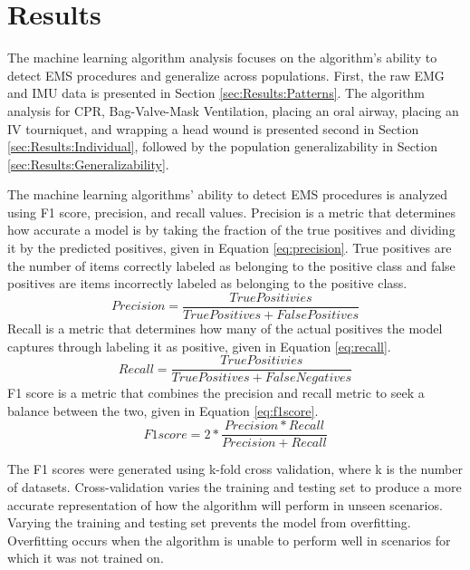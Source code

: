 
\chapter{Results}
\label{ch:Results}

The machine learning algorithm analysis focuses on the algorithm’s ability to detect EMS procedures and generalize across populations. First, the raw EMG and IMU data is presented in Section \ref{sec:Results:Patterns}. The algorithm analysis for CPR, Bag-Valve-Mask Ventilation, placing an oral airway, placing an IV tourniquet, and wrapping a head wound is presented second in Section \ref{sec:Results:Individual}, followed by the population generalizability in Section \ref{sec:Results:Generalizability}.
\par The machine learning algorithms' ability to detect EMS procedures is analyzed using F1 score, precision, and recall values. Precision is a metric that determines how accurate a model is by taking the fraction of the true positives and dividing it by the predicted positives, given in Equation \ref{eq:precision}. True positives are the number of items correctly labeled as belonging to the positive class and false positives are items incorrectly labeled as belonging to the positive class.
\begin{equation}\label{eq:precision}
Precision = \frac{True Positivies}{True Positives + False Positives}
\end{equation}
Recall is a metric that determines how many of the actual positives the model captures through labeling it as positive, given in Equation \ref{eq:recall}.
\begin{equation}\label{eq:recall}
Recall = \frac{True Positivies}{True Positives + False Negatives}
\end{equation}
F1 score is a metric that combines the precision and recall metric to seek a balance between the two, given in Equation \ref{eq:f1score}.
\begin{equation}\label{eq:f1score}
F1 score = 2 * \frac{Precision * Recall}{Precision + Recall	}
\end{equation}
\par The F1 scores were generated using k-fold cross validation, where k is the number of datasets. Cross-validation varies the training and testing set to produce a more accurate representation of how the algorithm will perform in unseen scenarios. Varying the training and testing set prevents the model from overfitting. Overfitting occurs when the algorithm is unable to perform well in scenarios for which it was not trained on.
